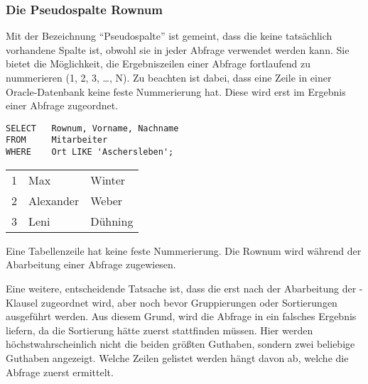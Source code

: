 \subsubsection{Die Pseudospalte Rownum}
Mit der Bezeichnung \enquote{Pseudospalte} ist gemeint, dass die  keine tatsächlich vorhandene Spalte ist, obwohl sie in jeder Abfrage verwendet werden kann. Sie bietet die Möglichkeit, die Ergebniszeilen einer Abfrage fortlaufend zu nummerieren (1, 2, 3, \dots, N). Zu beachten ist dabei, dass eine Zeile in einer Oracle-Datenbank keine feste Nummerierung hat. Diese wird erst im Ergebnis einer Abfrage zugeordnet.
\begin{lstlisting}[language=oracle_sql,caption={Ein einfaches Beispiel für die Rownum},label=sql06_11]
SELECT   Rownum, Vorname, Nachname
FROM     Mitarbeiter
WHERE    Ort LIKE 'Aschersleben';
          \end{lstlisting}
\begin{center}
    \begin{small}
        \tablehead{}
        \tabletail {
        }

        \begin{oraclesql}
            \begin{supertabular}{rll}
                1 & Max & Winter \\
                2 & Alexander & Weber \\
                3 & Leni & Dühning \\
            \end{supertabular}
        \end{oraclesql}
    \end{small}
\end{center}
\begin{merke}
    Eine Tabellenzeile hat keine feste Nummerierung. Die Rownum wird während der Abarbeitung einer Abfrage zugewiesen.
\end{merke}
Eine weitere, entscheidende Tatsache ist, dass die  erst nach der Abarbeitung der \WHERE-Klausel zugeordnet wird, aber noch bevor Gruppierungen oder Sortierungen ausgeführt werden. Aus diesem Grund, wird die Abfrage in  ein falsches Ergebnis liefern, da die Sortierung hätte zuerst stattfinden müssen. Hier werden höchstwahrscheinlich nicht die beiden größten Guthaben, sondern zwei beliebige Guthaben angezeigt. Welche Zeilen gelistet werden hängt davon ab, welche die Abfrage zuerst ermittelt.
